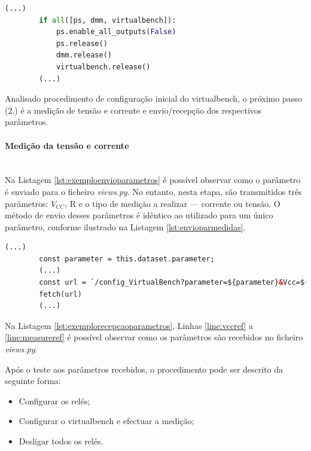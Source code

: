 \begin{minipage}{0.9\linewidth}
	\begin{lstlisting}[language=python, escapechar=|, caption=Exemplo de configuração: fonte de alimentação - STOP, label=lst:exemploSTOPPS]
		(...)
		if all([ps, dmm, virtualbench]):
		   	ps.enable_all_outputs(False)
        	ps.release()
        	dmm.release()
        	virtualbench.release()
		(...)
	\end{lstlisting}
\end{minipage}

Analisado procedimento de configuração inicial do \acrshort{virtualbench}, o próximo passo (2.) é a medição de tensão e corrente e envio/recepção dos respectivos parâmetros.

\paragraph{Medição da tensão e corrente} ~\\
Na Listagem \ref{lst:exemploenvioparametros} é possível observar como o parâmetro é enviado para o ficheiro \textit{views.py}. No entanto, nesta etapa, são transmitidos três parâmetros: $V_{CC}$, R e o tipo de medição a realizar — corrente ou tensão. O método de envio desses parâmetros é idêntico ao utilizado para um único parâmetro, conforme ilustrado na Listagem \ref{lst:envioparmedidas}.

\begin{minipage}{0.9\linewidth}
	\begin{lstlisting}[language=html, escapechar=|, caption=Envio de parâmetros da página \textit{ohm.html} para \textit{views.py}, label=lst:envioparmedidas]
		(...)
		const parameter = this.dataset.parameter;
		(...)
		const url = `/config_VirtualBench?parameter=${parameter}&Vcc=${Vcc}&R=${Resistance}`;
        fetch(url)
		(...)
	\end{lstlisting}
\end{minipage}

Na Listagem \ref{lst:exemplorecepcaoparametros}, Linhas \ref{line:vccref} a \ref{line:measureref} é possível observar como os parâmetros são recebidos no ficheiro \textit{views.py}.

Após o teste aos parâmetros recebidos, o procedimento pode ser descrito da seguinte forma:
\begin{itemize}
	\item Configurar os relés;
	\item Configurar o \acrshort{virtualbench} e efectuar a medição;
	\item Desligar todos os relés.
\end{itemize}

